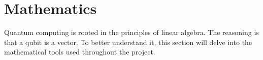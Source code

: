 
\section{Mathematics} Quantum computing is rooted in the principles of linear algebra. The reasoning is that a qubit is a vector. To better understand it, this section will delve into the mathematical tools used throughout the project.

\begin{definiton}
    
\end{definiton}